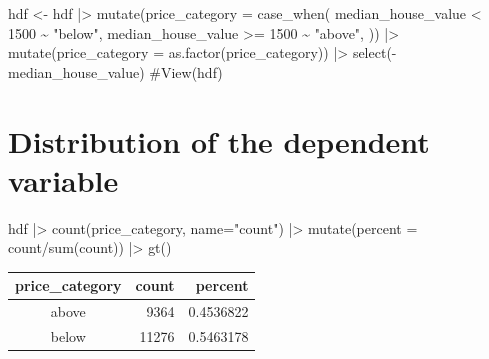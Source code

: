 \documentclass[
  letterpaper,
  DIV=11,
  numbers=noendperiod]{scrreprt}
\newenvironment{Shaded}{\begin{snugshade}}{\end{snugshade}}
\newcommand{\AttributeTok}[1]{\textcolor[rgb]{0.40,0.45,0.13}{#1}}
\newcommand{\CommentTok}[1]{\textcolor[rgb]{0.37,0.37,0.37}{#1}}
\newcommand{\DecValTok}[1]{\textcolor[rgb]{0.68,0.00,0.00}{#1}}
\newcommand{\FunctionTok}[1]{\textcolor[rgb]{0.28,0.35,0.67}{#1}}
\newcommand{\NormalTok}[1]{\textcolor[rgb]{0.00,0.23,0.31}{#1}}
\newcommand{\OtherTok}[1]{\textcolor[rgb]{0.00,0.23,0.31}{#1}}
\newcommand{\SpecialCharTok}[1]{\textcolor[rgb]{0.37,0.37,0.37}{#1}}
\newcommand{\StringTok}[1]{\textcolor[rgb]{0.13,0.47,0.30}{#1}}
\begin{document}
\begin{Shaded}
\begin{Highlighting}[]
\NormalTok{hdf }\OtherTok{\textless{}{-}}\NormalTok{ hdf }\SpecialCharTok{|\textgreater{}}
  \FunctionTok{mutate}\NormalTok{(}\AttributeTok{price\_category =} \FunctionTok{case\_when}\NormalTok{(}
\NormalTok{    median\_house\_value }\SpecialCharTok{\textless{}} \DecValTok{1500} \SpecialCharTok{\textasciitilde{}} \StringTok{"below"}\NormalTok{,}
\NormalTok{    median\_house\_value }\SpecialCharTok{\textgreater{}=} \DecValTok{1500} \SpecialCharTok{\textasciitilde{}} \StringTok{"above"}\NormalTok{,}
\NormalTok{  )) }\SpecialCharTok{|\textgreater{}}
  \FunctionTok{mutate}\NormalTok{(}\AttributeTok{price\_category =} \FunctionTok{as.factor}\NormalTok{(price\_category)) }\SpecialCharTok{|\textgreater{}}
  \FunctionTok{select}\NormalTok{(}\SpecialCharTok{{-}}\NormalTok{median\_house\_value)}
\CommentTok{\#View(hdf)}
\end{Highlighting}
\end{Shaded}

\section{Distribution of the dependent
variable}\label{distribution-of-the-dependent-variable}

\begin{Shaded}
\begin{Highlighting}[]
\NormalTok{hdf }\SpecialCharTok{|\textgreater{}}
  \FunctionTok{count}\NormalTok{(price\_category, }\AttributeTok{name=}\StringTok{"count"}\NormalTok{) }\SpecialCharTok{|\textgreater{}}
  \FunctionTok{mutate}\NormalTok{(}\AttributeTok{percent =}\NormalTok{ count}\SpecialCharTok{/}\FunctionTok{sum}\NormalTok{(count)) }\SpecialCharTok{|\textgreater{}}
  \FunctionTok{gt}\NormalTok{()}
\end{Highlighting}
\end{Shaded}

\begin{table}
\fontsize{12.0pt}{14.4pt}\selectfont
\begin{tabular*}{\linewidth}{@{\extracolsep{\fill}}crr}
\toprule
price\_category & count & percent \\ 
\midrule\addlinespace[2.5pt]
above & 9364 & 0.4536822 \\ 
below & 11276 & 0.5463178 \\ 
\bottomrule
\end{tabular*}
\end{table}
\end{document}
